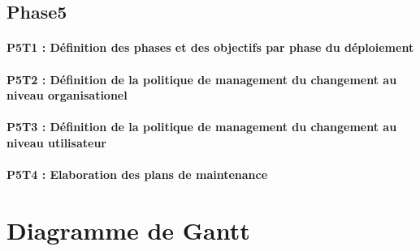 \subsection{Phase5}
\paragraph{P5T1 : Définition des phases et des objectifs par phase du déploiement }
\paragraph{P5T2 : Définition de la politique de management du changement au niveau organisationel}
\paragraph{P5T3 : Définition de la politique de management du changement au niveau utilisateur}
\paragraph{P5T4 : Elaboration des plans de maintenance}

\section{Diagramme de Gantt}
